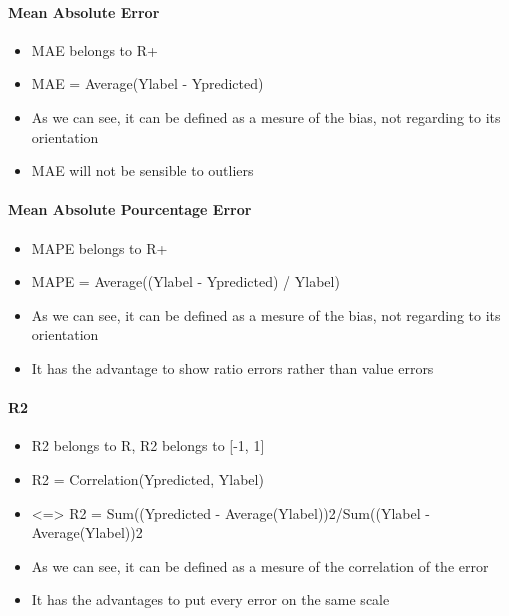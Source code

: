 \documentclass[11pt]{article}
\providecommand{\tightlist}{%
      \setlength{\itemsep}{0pt}\setlength{\parskip}{0pt}}
\begin{document}
    \hypertarget{mean-absolute-error}{%
\paragraph{Mean Absolute Error}\label{mean-absolute-error}}

\begin{itemize}
\tightlist
\item
  MAE belongs to R+
\item
  MAE = Average(\textbar Ylabel - Ypredicted\textbar)
\item
  As we can see, it can be defined as a mesure of the bias, not
  regarding to its orientation
\item
  MAE will not be sensible to outliers
\end{itemize}

    \hypertarget{mean-absolute-pourcentage-error}{%
\paragraph{Mean Absolute Pourcentage
Error}\label{mean-absolute-pourcentage-error}}

\begin{itemize}
\tightlist
\item
  MAPE belongs to R+
\item
  MAPE = Average(\textbar(Ylabel - Ypredicted) / Ylabel\textbar)
\item
  As we can see, it can be defined as a mesure of the bias, not
  regarding to its orientation
\item
  It has the advantage to show ratio errors rather than value errors
\end{itemize}

    \hypertarget{r2}{%
\paragraph{R2}\label{r2}}

\begin{itemize}
\tightlist
\item
  R2 belongs to R, R2 belongs to {[}-1, 1{]}
\item
  R2 = Correlation(Ypredicted, Ylabel)
\item
  \textless=\textgreater{} R2 = Sum((Ypredicted -
  Average(Ylabel))2/Sum((Ylabel - Average(Ylabel))2
\item
  As we can see, it can be defined as a mesure of the correlation of the
  error
\item
  It has the advantages to put every error on the same scale
\end{itemize}
\end{document}
